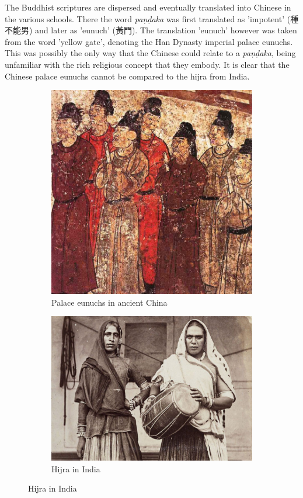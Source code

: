 The Buddhist scriptures are dispersed and eventually translated into Chinese in the various schools. There the word {\em paṇḍaka} was first translated as 'impotent' (種不能男) and later as 'eunuch' (黃門). The translation 'eunuch' however was taken from the word 'yellow gate', denoting the Han Dynasty imperial palace eunuchs. This was possibly the only way that the Chinese could relate to a {\em paṇḍaka}, being unfamiliar with the rich religious concept that they embody. It is clear that the Chinese palace eunuchs cannot be compared to the hijra from India.

\begin{figure}[!tbp]
  \begin{subfigure}[b]{0.4\textwidth}
    \includegraphics[width=\textwidth]{Eunuchs-in-ancient-China.jpg}
    \caption{Palace eunuchs in ancient China}
  \end{subfigure}
  \hfill
  \begin{subfigure}[b]{0.4\textwidth}
    \includegraphics[width=\textwidth]{hijra.jpg}
    \caption{Hijra in India}
  \end{subfigure}
\end{figure}

